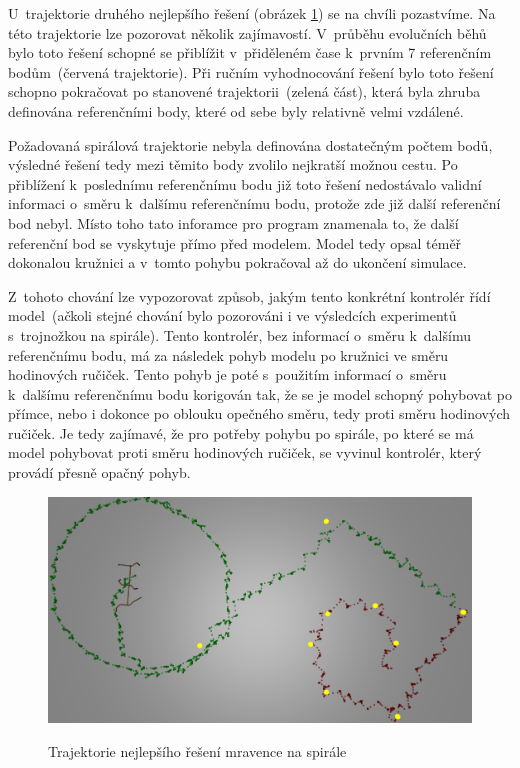U~trajektorie druhého nejlepšího řešení (obrázek \ref{fig:mravenec_spirala_zhora_nejlepsi_reseni_trajektorie}) se na chvíli pozastvíme.
Na této trajektorie lze pozorovat několik zajímavostí.
V~průběhu evolučních běhů bylo toto řešení schopné se přiblížit v~přiděleném čase k~prvním 7 referenčním bodům~(červená trajektorie).
Při ručním vyhodnocování řešení bylo toto řešení schopno pokračovat po stanovené trajektorii~(zelená část), která byla zhruba definována referenčními body, které od sebe byly relativně velmi vzdálené.

Požadovaná spirálová trajektorie nebyla definována dostatečným počtem bodů, výsledné řešení tedy mezi těmito body zvolilo nejkratší možnou cestu.
Po přiblížení k~poslednímu referenčnímu bodu již toto řešení nedostávalo validní informaci o~směru k~dalšímu referenčnímu bodu, protože zde již další referenční bod nebyl.
Místo toho tato inforamce pro program znamenala to, že další referenční bod se vyskytuje přímo před modelem.
Model tedy opsal téměř dokonalou kružnici a v~tomto pohybu pokračoval až do ukončení simulace.

Z~tohoto chování lze vypozorovat způsob, jakým tento konkrétní kontrolér řídí model~(ačkoli stejné chování bylo pozorováni i ve výsledcích experimentů s~trojnožkou na spirále).
Tento kontrolér, bez informací o~směru k~dalšímu referenčnímu bodu, má za následek pohyb modelu po kružnici ve směru hodinových ručiček.
Tento pohyb je poté s~použitím informací o~směru k~dalšímu referenčnímu bodu korigován tak, že se je model schopný pohybovat po přímce, nebo i dokonce po oblouku opečného směru, tedy proti směru hodinových ručiček.
Je tedy zajímavé, že pro potřeby pohybu po spirále, po které se má model pohybovat proti směru hodinových ručiček, se vyvinul kontrolér, který provádí přesně opačný pohyb.


\begin{figure}[h]
    \centering
    {\includegraphics[width=\linewidth]{obrazky/mravenec_spirala_zhora_nejlepsi_reseni_trajektorie.png}}
    \caption{
    Trajektorie nejlepšího řešení mravence na spirále
    }
    \label{fig:mravenec_spirala_zhora_nejlepsi_reseni_trajektorie}
\end{figure}

